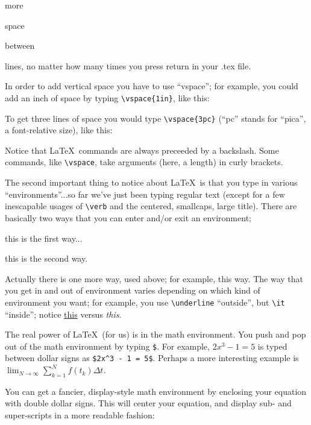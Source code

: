 \documentclass{article}
\begin{document}
more 




space 


between 




lines, no matter how many times you press return in your .tex file.

In order to add vertical space you have to use ``vspace''; for example, 
you could add an inch of space by typing \verb|\vspace{1in}|, like this:
\vspace{1in}

To get three lines of space you would type \verb|\vspace{3pc}|
(``pc'' stands for ``pica'', a font-relative size), like this:
\vspace{3pc}

Notice that \LaTeX\ commands are always preceeded by a backslash.  
Some commands, like \verb|\vspace|, take arguments (here, a length) in
curly brackets.  

The second important thing to notice about \LaTeX\ is that you type 
in various ``environments''...so far we've just been typing regular 
text (except for a few inescapable usages of \verb|\verb| and the
centered, smallcaps, large title).  There are basically two ways that 
you can enter and/or exit an environment;
\vspace{1pc}

\centerline{this is the first way...}

\begin{center}
this is the second way.
\end{center}

\noindent Actually there is one more way, used above; for example, 
{\sc this way}.  The way that you get in and out of environment varies
depending on which kind of environment you want; for example, you use 
\verb|\underline| ``outside'', but \verb|\it| ``inside''; 
notice \underline{this} versus {\it this}.

The real power of \LaTeX\ (for us) is in the math environment. You 
push and pop out of the math environment by typing \verb|$|. For 
example, $2x^3 - 1 = 5$ is typed between dollar signs as
\verb|$2x^3 - 1 = 5$|. Perhaps a more interesting example is
$\lim_{N \to \infty} \sum_{k=1}^N f(t_k) \Delta t$.

You can get a fancier, display-style math 
environment by enclosing your equation with double dollar signs.  
This will center your equation, and display sub- and super-scripts in 
a more readable fashion:
\end{document}
